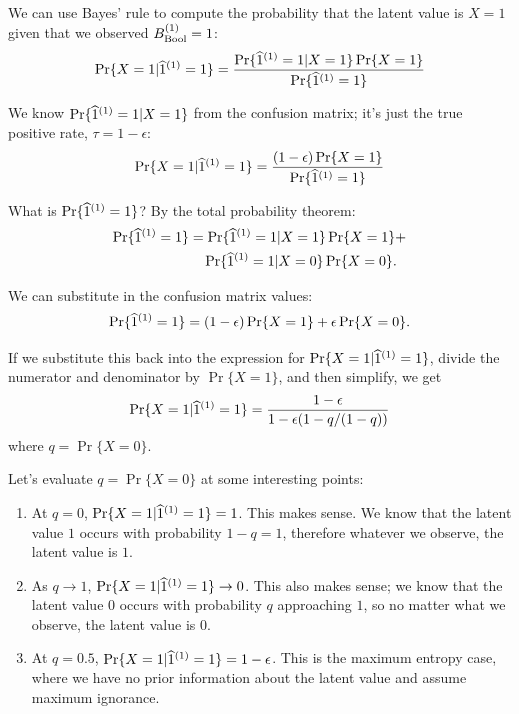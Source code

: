 \documentclass[../main.tex]{subfiles}
\begin{document}
We can use Bayes' rule to compute the probability that the latent value is $X=1$ given that we observed $B_{\mathrm{Bool}}^{(1)} = 1$:
\begin{equation}
\Pr\{X = 1 | \widehat{1}^{(1)} = 1\} =
    \frac{
        \Pr\{\widehat{1}^{(1)} =1 | X=1\} \Pr\{X = 1\}
    }
    {
        \Pr\{\widehat{1}^{(1)} = 1\}
    }
\end{equation}

We know $\Pr\{\widehat{1}^{(1)}=1 | X = 1\}$ from the confusion matrix; it's just the true positive rate, $\tau = 1 - \epsilon$:
\begin{equation}
\Pr\{X=1 | \widehat{1}^{(1)}=1\} = \frac
    {(1-\epsilon) \Pr\{X = 1\}}
    {\Pr\{\widehat{1}^{(1)}=1\}}
\end{equation}

What is $\Pr\{\widehat{1}^{(1)} = 1\}$? By the total probability theorem:
\begin{align}
\Pr\{\widehat{1}^{(1)} = 1\} &= \Pr\{\widehat{1}^{(1)}=1 | X=1\} \Pr\{X = 1\} + \nonumber\\
    &\quad \Pr\{\widehat{1}^{(1)}=1 | X=0\} \Pr\{X = 0\}.
\end{align}

We can substitute in the confusion matrix values:
\begin{equation}
\Pr\{\widehat{1}^{(1)} = 1\} = (1-\epsilon) \Pr\{X = 1\} + \epsilon \Pr\{X = 0\}.
\end{equation}

If we substitute this back into the expression for $\Pr\{X=1 | \widehat{1}^{(1)}=1\}$, divide the numerator and denominator by $\Pr\{X = 1\}$, and then simplify, we get
\begin{equation}
\Pr\{X=1 | \widehat{1}^{(1)}=1\} = \frac
    {1-\epsilon}
    {1-\epsilon (1 - q/(1-q))}
\end{equation}
where $q = \Pr\{X = 0\}$.

Let's evaluate $q = \Pr\{X = 0\}$ at some interesting points:

\begin{enumerate}
\item At $q = 0$, $\Pr\{X=1 | \widehat{1}^{(1)}=1\} = 1$. This makes sense. We know that the latent value $1$ occurs with probability $1-q=1$, therefore whatever we observe, the latent value is $1$.
\item As $q \to 1$, $\Pr\{X=1 |\widehat{1}^{(1)}=1\} \to 0$. This also makes sense; we know that the latent value $0$ occurs with probability $q$ approaching $1$, so no matter what we observe, the latent value is $0$.
\item At $q = 0.5$, $\Pr\{X=1 |\widehat{1}^{(1)}=1\} = 1-\epsilon$. This is the maximum entropy case, where we have no prior information about the latent value and assume maximum ignorance.
\end{enumerate}
\end{document}
